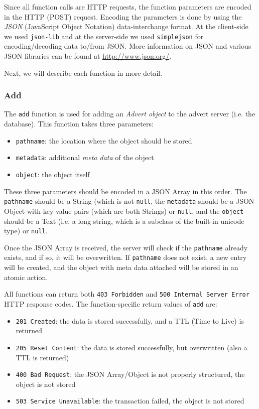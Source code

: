 Since all function calls are HTTP requests, the function parameters are encoded
in the HTTP (POST) request. Encoding the parameters is done by using the
\emph{JSON} (JavaScript Object Notation) data-interchange format. At the
client-side we used \texttt{json-lib} and at the server-side we used
\texttt{simplejson} for encoding/decoding data to/from JSON. More information
on JSON and various JSON libraries can be found at \url{http://www.json.org/}.

Next, we will describe each function in more detail.

\subsubsection{Add}
\label{add}
The \texttt{add} function is used for adding an \emph{Advert object} to the
advert server (i.e. the database). This function takes three parameters:

\begin{itemize}
  \item \texttt{pathname}: the location where the object should be stored
  \item \texttt{metadata}: additional \emph{meta data} of the object
  \item \texttt{object}: the object itself
\end{itemize}

These three parameters should be encoded in a JSON Array in this order. The
\texttt{pathname} should be a String (which is not \texttt{null}, the
\texttt{metadata} should be a JSON Object with key-value pairs (which are both
Strings) or \texttt{null}, and the \texttt{object} should be a Text (i.e. a long
string, which is a subclass of the built-in unicode type) or \texttt{null}.

Once the JSON Array is received, the server will check if the \texttt{pathname}
already exists, and if so, it will be overwritten. If \texttt{pathname} does
not exist, a new entry will be created, and the object with meta data attached
will be stored in an atomic action.

All functions can return both \texttt{403 Forbidden} and \texttt{500 Internal
Server Error} HTTP response codes. The function-specific return values of
\texttt{add} are:

\begin{itemize}
  \item \texttt{201 Created}: the data is stored successfully, and a TTL (Time
  to
  Live) is returned
  \item \texttt{205 Reset Content}: the data is stored successfully, but
  overwritten (also a TTL is returned)
  \item \texttt{400 Bad Request}: the JSON Array/Object is not properly
  structured, the object is not stored
  \item \texttt{503 Service Unavailable}: the transaction failed, the object is
  not stored
\end{itemize}

